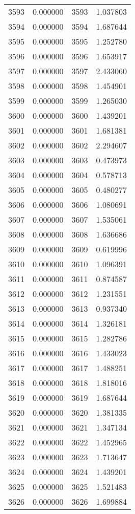 \documentclass[12pt]{article}
\begin{document}
\begin{longtable}{@{}cccc@{}}
3593 & 0.000000 & 3593 & 1.037803 \\
3594 & 0.000000 & 3594 & 1.687644 \\
3595 & 0.000000 & 3595 & 1.252780 \\
3596 & 0.000000 & 3596 & 1.653917 \\
3597 & 0.000000 & 3597 & 2.433060 \\
3598 & 0.000000 & 3598 & 1.454901 \\
3599 & 0.000000 & 3599 & 1.265030 \\
3600 & 0.000000 & 3600 & 1.439201 \\
3601 & 0.000000 & 3601 & 1.681381 \\
3602 & 0.000000 & 3602 & 2.294607 \\
3603 & 0.000000 & 3603 & 0.473973 \\
3604 & 0.000000 & 3604 & 0.578713 \\
3605 & 0.000000 & 3605 & 0.480277 \\
3606 & 0.000000 & 3606 & 1.080691 \\
3607 & 0.000000 & 3607 & 1.535061 \\
3608 & 0.000000 & 3608 & 1.636686 \\
3609 & 0.000000 & 3609 & 0.619996 \\
3610 & 0.000000 & 3610 & 1.096391 \\
3611 & 0.000000 & 3611 & 0.874587 \\
3612 & 0.000000 & 3612 & 1.231551 \\
3613 & 0.000000 & 3613 & 0.937340 \\
3614 & 0.000000 & 3614 & 1.326181 \\
3615 & 0.000000 & 3615 & 1.282786 \\
3616 & 0.000000 & 3616 & 1.433023 \\
3617 & 0.000000 & 3617 & 1.488251 \\
3618 & 0.000000 & 3618 & 1.818016 \\
3619 & 0.000000 & 3619 & 1.687644 \\
3620 & 0.000000 & 3620 & 1.381335 \\
3621 & 0.000000 & 3621 & 1.347134 \\
3622 & 0.000000 & 3622 & 1.452965 \\
3623 & 0.000000 & 3623 & 1.713647 \\
3624 & 0.000000 & 3624 & 1.439201 \\
3625 & 0.000000 & 3625 & 1.521483 \\
3626 & 0.000000 & 3626 & 1.699884 \\

\end{longtable}
\end{document}
